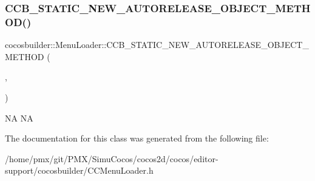 \subsubsection{\texorpdfstring{C\+C\+B\+\_\+\+S\+T\+A\+T\+I\+C\+\_\+\+N\+E\+W\+\_\+\+A\+U\+T\+O\+R\+E\+L\+E\+A\+S\+E\+\_\+\+O\+B\+J\+E\+C\+T\+\_\+\+M\+E\+T\+H\+O\+D()}{CCB\_STATIC\_NEW\_AUTORELEASE\_OBJECT\_METHOD()}\hspace{0.1cm}{\footnotesize\ttfamily [2/2]}}
{\footnotesize\ttfamily cocosbuilder\+::\+Menu\+Loader\+::\+C\+C\+B\+\_\+\+S\+T\+A\+T\+I\+C\+\_\+\+N\+E\+W\+\_\+\+A\+U\+T\+O\+R\+E\+L\+E\+A\+S\+E\+\_\+\+O\+B\+J\+E\+C\+T\+\_\+\+M\+E\+T\+H\+OD (\begin{DoxyParamCaption}\item[{\hyperlink{classcocosbuilder_1_1MenuLoader}{Menu\+Loader}}]{,  }\item[{loader}]{ }\end{DoxyParamCaption})}

NA  NA 

The documentation for this class was generated from the following file\+:\begin{DoxyCompactItemize}
\item 
/home/pmx/git/\+P\+M\+X/\+Simu\+Cocos/cocos2d/cocos/editor-\/support/cocosbuilder/C\+C\+Menu\+Loader.\+h\end{DoxyCompactItemize}

